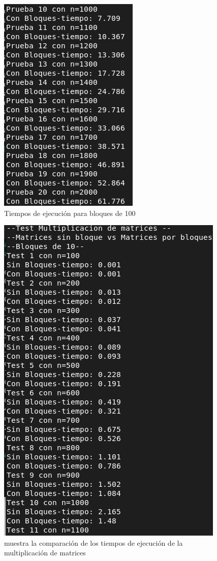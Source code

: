 \documentclass{article}
\begin{document}
\begin{enumerate}
\begin{figure}[h!]
    \centering
   \includegraphics[width=0.5\linewidth]{imagenes/Captura de pantalla de 2023-09-24 20-49-23.png}
   \caption{Tiempos de ejecución para bloques de 100}
   \label{fig:figura5}
\end{figure}

\begin{figure}[h!]
    \centering
   \includegraphics[width=0.5\linewidth]{imagenes/Captura de pantalla de 2023-09-24 20-05-13.png}
   \caption{muestra la comparación de los tiempos de ejecución de la multiplicación de matrices}
   \label{fig:compara}
\end{figure}


\end{enumerate}
\end{document}
